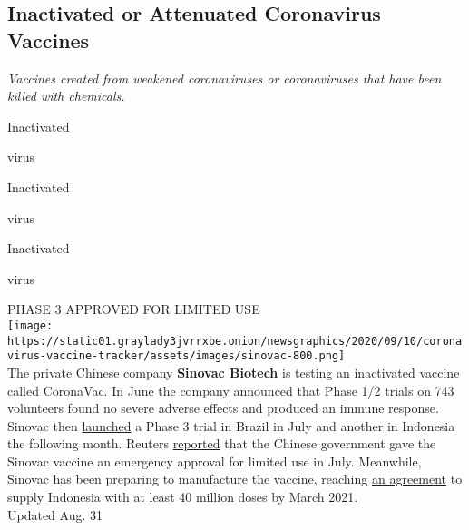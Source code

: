 \hypertarget{inactivated-or-attenuated-coronavirus-vaccines}{%
\subsection{\texorpdfstring{\textbf{Inactivated or Attenuated
Coronavirus
Vaccines}}{Inactivated or Attenuated Coronavirus Vaccines}}\label{inactivated-or-attenuated-coronavirus-vaccines}}

\emph{Vaccines created from weakened coronaviruses or coronaviruses that
have been killed with chemicals.}

Inactivated

virus

Inactivated

virus

Inactivated

virus

PHASE 3 APPROVED FOR LIMITED USE\\
\texttt{[image: https://static01.graylady3jvrrxbe.onion/newsgraphics/2020/09/10/coronavirus-vaccine-tracker/assets/images/sinovac-800.png]}\\
The private Chinese company \textbf{\textbf{Sinovac Biotech}} is testing
an inactivated vaccine called CoronaVac. In June the company announced
that Phase 1/2 trials on 743 volunteers found no severe adverse effects
and produced an immune response. Sinovac then
\href{http://www.sinovac.com/?optionid=754\&auto_id=907}{launched} a
Phase 3 trial in Brazil in July and another in Indonesia the following
month. Reuters
\href{https://www.nytimes3xbfgragh.onion/reuters/2020/08/28/world/asia/28reuters-health-coronavirus-china-vaccines.html}{reported}
that the Chinese government gave the Sinovac vaccine an emergency
approval for limited use in July. Meanwhile, Sinovac has been preparing
to manufacture the vaccine, reaching
\href{https://www.businesswire.com/news/home/20200825005451/en/Sinovac-Signs-Agreement-Bio-Farma-Indonesia-COVID-19}{an
agreement} to supply Indonesia with at least 40 million doses by March
2021.\\
Updated Aug. 31

